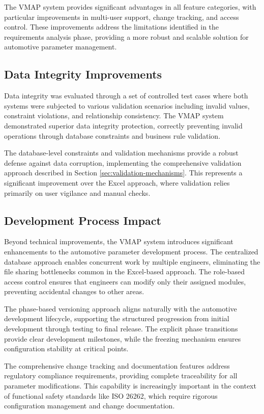 The \ac{VMAP} system provides significant advantages in all feature categories, with particular improvements in multi-user support, change tracking, and access control. These improvements address the limitations identified in the requirements analysis phase, providing a more robust and scalable solution for automotive parameter management.

\subsection{Data Integrity Improvements}
\label{subsec:data-integrity-improvements}

Data integrity was evaluated through a set of controlled test cases where both systems were subjected to various validation scenarios including invalid values, constraint violations, and relationship consistency. The \ac{VMAP} system demonstrated superior data integrity protection, correctly preventing invalid operations through database constraints and business rule validation.

The database-level constraints and validation mechanisms provide a robust defense against data corruption, implementing the comprehensive validation approach described in Section \ref{sec:validation-mechanisms}. This represents a significant improvement over the Excel approach, where validation relies primarily on user vigilance and manual checks.

\subsection{Development Process Impact}
\label{subsec:development-process-impact}

Beyond technical improvements, the \ac{VMAP} system introduces significant enhancements to the automotive parameter development process. The centralized database approach enables concurrent work by multiple engineers, eliminating the file sharing bottlenecks common in the Excel-based approach. The role-based access control ensures that engineers can modify only their assigned modules, preventing accidental changes to other areas.

The phase-based versioning approach aligns naturally with the automotive development lifecycle, supporting the structured progression from initial development through testing to final release. The explicit phase transitions provide clear development milestones, while the freezing mechanism ensures configuration stability at critical points.

The comprehensive change tracking and documentation features address regulatory compliance requirements, providing complete traceability for all parameter modifications. This capability is increasingly important in the context of functional safety standards like ISO 26262, which require rigorous configuration management and change documentation.

